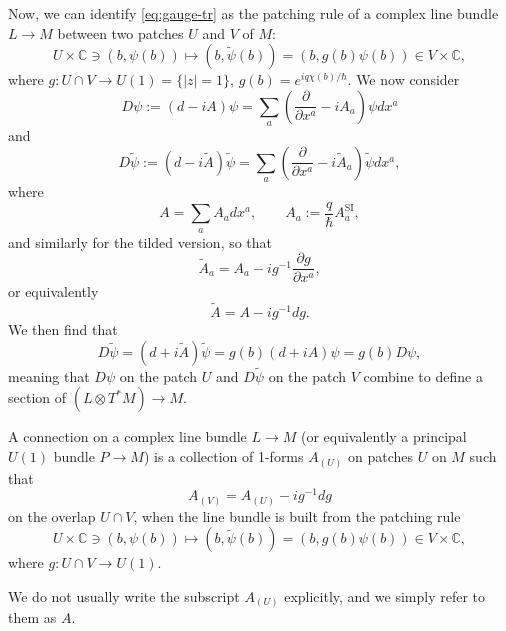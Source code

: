 \documentclass[12pt]{article}
\numberwithin{equation}{section}
\theoremstyle{remark}
\def\bC{\mathbb{C}}
\begin{document}
Now, we can identify \eqref{eq:gauge-tr} as the patching rule of a complex line bundle $L\to M$  between two patches $U$ and $V$ of $M$:
\begin{equation}
  U\times \bC \ni (b,\psi(b)) \mapsto (b,\tilde\psi(b))=(b,g(b)\psi(b)) \in V\times \bC,
\end{equation} where $g:U\cap V\to U(1)=\{|z|=1\}$, $g(b)=e^{iq\chi(b)/\hbar}$.
We now consider \begin{equation}
D\psi :=(d - i A )\psi = \sum_a \left(\frac{\partial}{\partial x^a} - i A_a\right)\psi dx^a
\end{equation} and \begin{equation}
D\tilde\psi:=(d - i\tilde A) \tilde\psi = \sum_a \left(\frac{\partial}{\partial x^a} - i \tilde A_a\right)\tilde\psi dx^a,
\end{equation} where \begin{equation}
A= \sum_a A_a dx^a, \qquad A_a := \frac{q}{\hbar} A^\text{SI}_a,
\end{equation} and similarly for the tilded version, so that \begin{equation}
\tilde A_a = A_a - i g^{-1} \frac{\partial g}{\partial x^a},
\end{equation} or equivalently \begin{equation}
\tilde A = A - i g^{-1} dg.
\end{equation}
We then find that \begin{equation}
D\tilde \psi = (d + i\tilde A) \tilde\psi = g(b) (d + i A) \psi = g(b) D\psi,
\end{equation}
meaning that $D\psi$ on the patch $U$ and $D\tilde \psi$ on the patch $V$
 combine to define a section of $(L\otimes T^*M) \to M$.

\begin{definition}
A connection on a complex line bundle $L\to M$ 
(or equivalently a principal $U(1)$ bundle $P\to M$)
is a collection of 1-forms $A_{(U)}$ on patches $U$ on $M$ such that \begin{equation}
  A_{(V)}=A_{(U)} - i g^{-1} dg
\end{equation}
on the overlap $U\cap V$, when the line bundle is built from the patching rule \begin{equation}
  U\times \bC \ni (b,\psi(b)) \mapsto (b,\tilde\psi(b))=(b,g(b)\psi(b)) \in V\times \bC,
\end{equation}
where $g:U\cap V\to U(1)$.
\end{definition}

We do not usually write the subscript $A_{(U)}$ explicitly,
and we simply refer to them as $A$.
\end{document}
